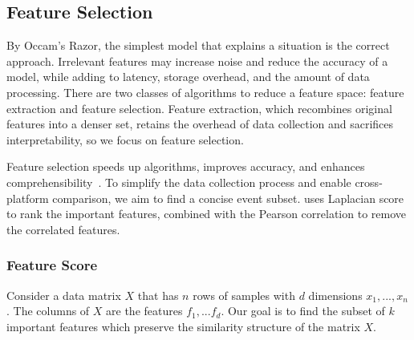 \subsection{Feature Selection}
By Occam’s Razor, the simplest model that explains a situation is the correct approach. 
Irrelevant features may increase noise and reduce the accuracy of a model, while adding to latency, storage overhead, and the amount of data processing. There are two classes of algorithms to reduce a feature space: feature extraction and feature selection. 
Feature extraction, which recombines original features into a denser set, retains the overhead of data collection and sacrifices interpretability, so we focus on feature selection.

Feature selection speeds up algorithms, improves accuracy, and enhances comprehensibility~\cite{guyon2003introduction}. 
To simplify the data collection process and enable cross-platform comparison, we aim to find a concise event subset. \us uses Laplacian score~\cite{he2005laplacian} to rank the important features, combined with the Pearson correlation to remove the correlated features.

\subsubsection{Feature Score}
\label{sec:feature_score}
Consider a data matrix $X$ that has $n$ rows of samples with $d$ dimensions $x_{1},...,x_{n}$. The columns of $X$ are the features $f_{1},...f_{d}$. Our goal is to find the subset of $k$ important features which preserve the similarity structure of the matrix $X$. 

